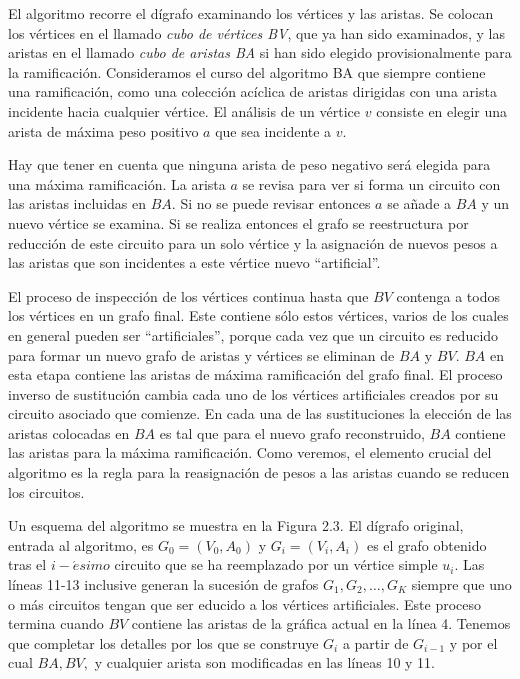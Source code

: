 \documentclass[10pt,a5paper]{book}
\begin{document}
El algoritmo recorre el dígrafo examinando los vértices y las aristas. Se colocan los vértices en el llamado \emph{cubo de vértices BV}, que ya han sido examinados, y las aristas en el llamado \emph{cubo de aristas BA} si han sido elegido provisionalmente para la ramificación. Consideramos el curso del algoritmo BA que siempre contiene una ramificación, como una colección acíclica de aristas dirigidas con una arista incidente hacia cualquier vértice. El análisis de un vértice $v$ consiste en elegir una arista de máxima peso positivo $a$ que sea incidente a $v$.

Hay que tener en cuenta que ninguna arista de peso negativo será elegida para una máxima ramificación. La arista $a$ se revisa para ver si forma un circuito con las aristas incluidas en $BA$. Si no se puede revisar entonces $a$ se añade a $BA$ y un nuevo vértice se examina. Si se realiza entonces el grafo se reestructura por reducción de este circuito para un solo vértice y la asignación de nuevos pesos a las aristas que son incidentes a este vértice nuevo ``artificial''.

El proceso de inspección de los vértices continua hasta que $BV$ contenga a todos los vértices en un grafo final. Este contiene sólo estos vértices, varios de los cuales en general pueden ser ``artificiales'', porque cada vez que un circuito es reducido para formar un nuevo grafo de aristas y vértices se eliminan de $BA$ y $BV$. $BA$ en esta etapa contiene las aristas de máxima ramificación del grafo final. El proceso inverso de sustitución cambia cada uno de los vértices artificiales creados por su circuito asociado que comienze. En cada una de las sustituciones la elección de las aristas colocadas en $BA$ es tal que para el nuevo grafo reconstruido, $BA$ contiene las aristas para la máxima ramificación. Como veremos, el elemento crucial del algoritmo es la regla para la reasignación de pesos a las aristas cuando se reducen los circuitos.

Un esquema del algoritmo se muestra en la Figura 2.3. El dígrafo original, entrada al algoritmo, es $G_0 = (V_0,A_0)$ y $G_i = (V_i,A_i)$ es el grafo obtenido tras el $i-\acute{e}simo$ circuito que se ha reemplazado por un vértice simple $u_i$. Las líneas 11-13 inclusive generan la sucesión de grafos $G_1,G_2, \ldots, G_K$ siempre que uno o más circuitos tengan que ser educido a los vértices artificiales. Este proceso termina cuando $BV$ contiene las aristas de la gráfica actual en la línea 4. Tenemos que completar los detalles por los que se construye $G_i$ a partir de $G_{i-1}$ y por el cual $BA, BV,$ y cualquier arista son modificadas en las líneas 10 y 11.
\end{document}
